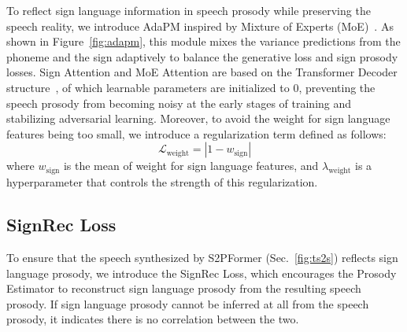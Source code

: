 
To reflect sign language information in speech prosody while preserving the speech reality, we introduce AdaPM inspired by Mixture of Experts (MoE)~\cite{shazeer2017outrageouslylargeneuralnetworks}. As shown in Figure~\ref{fig:adapm}, this module mixes the variance predictions from the phoneme and the sign adaptively to balance the generative loss and sign prosody losses. Sign Attention and MoE Attention are based on the Transformer Decoder structure~\cite{NIPS2017_3f5ee243}, of which learnable parameters are initialized to 0, preventing the speech prosody from becoming noisy at the early stages of training and stabilizing adversarial learning.
Moreover, to avoid the weight for sign language features being too small, we introduce a regularization term defined as follows:
\begin{equation}
    \mathcal{L}_{\mathrm{weight}} = |1 - w_{\mathrm{sign}}|
\end{equation}
where $w_{\mathrm{sign}}$ is the mean of weight for sign language features, and $\lambda_{\mathrm{weight}}$ is a hyperparameter that controls the strength of this regularization.

\subsection{SignRec Loss}
\label{sec:prosody_rec}
To ensure that the speech synthesized by S2PFormer (Sec.~\ref{fig:ts2s}) reflects sign language prosody,
we introduce the SignRec Loss, which encourages the Prosody Estimator to reconstruct sign language prosody from the resulting speech prosody.
If sign language prosody cannot be inferred at all from the speech prosody, 
it indicates there is no correlation between the two.

